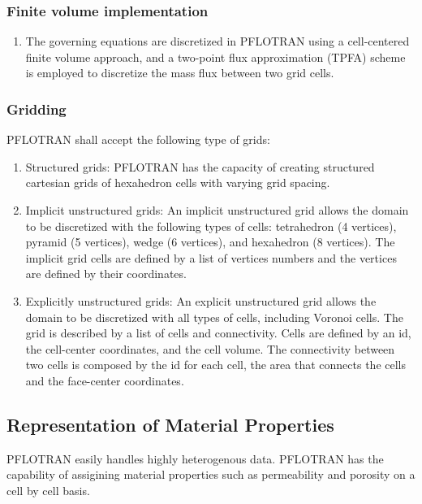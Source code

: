 \subsubsection{Finite volume implementation}
\begin{enumerate}[label=NM \arabic*.,ref=NM \arabic*,nosep, resume]
	\item The governing equations are discretized in PFLOTRAN using a cell-centered finite volume approach, and a two-point flux approximation (TPFA) scheme is employed to discretize the mass flux between two grid cells. \label{FVmethod} 
\end{enumerate}

\subsubsection{Gridding}
PFLOTRAN shall accept the following type of grids:
\begin{enumerate}[label=NM \arabic*.,ref=NM \arabic*,nosep, resume]
	\item Structured grids:  \label{structGrid} PFLOTRAN has the capacity of creating structured cartesian grids of hexahedron cells with varying grid spacing.
	\item Implicit unstructured grids: \label{impStructGrid} An implicit unstructured grid allows the domain to be discretized with the following types of cells: tetrahedron (4 vertices), pyramid (5 vertices), wedge (6 vertices), and hexahedron (8 vertices). The implicit grid cells are defined by a list of vertices numbers and the vertices are defined by their coordinates.
	\item Explicitly unstructured grids: \label{expStructGrid} An explicit unstructured grid allows the domain to be discretized with all types of cells, including Voronoi cells. The grid is described by a list of cells and connectivity. Cells are defined by an id, the cell-center coordinates, and the cell volume. The connectivity between two cells is composed by the id for each cell, the area that connects the cells and the face-center coordinates.
\end{enumerate}
\subsection{Representation of Material Properties}
PFLOTRAN easily handles highly heterogenous data. PFLOTRAN has the capability of assigining material properties such as permeability and porosity on a cell by cell basis.

